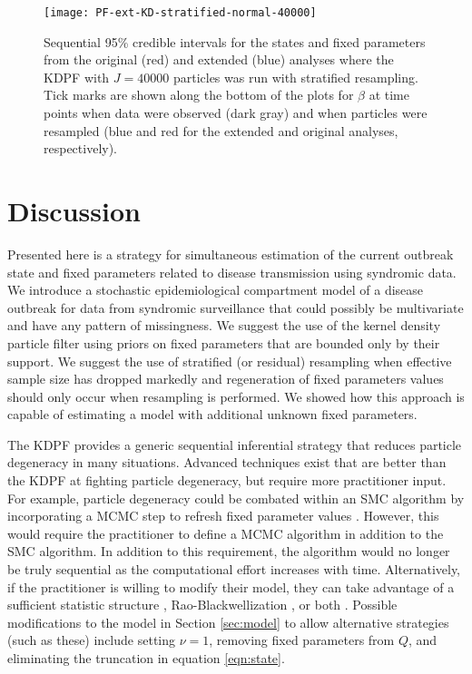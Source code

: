 \documentclass{elsarticle}
\begin{document}
\begin{figure}
\centering
\texttt{[image: PF-ext-KD-stratified-normal-40000]}
\caption{Sequential 95\% credible intervals for the states and fixed parameters from the original (red) and extended (blue) analyses where the KDPF with $J = 40000$ particles was run with stratified resampling. Tick marks are shown along the bottom of the plots for $\beta$ at time points when data were observed (dark gray) and when particles were resampled (blue and red for the extended and original analyses, respectively).} \label{fig:ext}
\end{figure}

\section{Discussion \label{sec:discussion}}

Presented here is a strategy for simultaneous estimation of the current outbreak state and fixed parameters related to disease transmission using syndromic data. We introduce a stochastic epidemiological compartment model of a disease outbreak for data from syndromic surveillance that could possibly be multivariate and have any pattern of missingness. We suggest the use of the kernel density particle filter \citep{Liu:West:comb:2001} using priors on fixed parameters that are bounded only by their support. We suggest the use of stratified (or residual) resampling when effective sample size has dropped markedly and regeneration of fixed parameters values should only occur when resampling is performed. We showed how this approach is capable of estimating a model with additional unknown fixed parameters.

The KDPF provides a generic sequential inferential strategy that reduces particle degeneracy in many situations. Advanced techniques exist that are better than the KDPF at fighting particle degeneracy, but require more practitioner input. For example, particle degeneracy could be combated within an SMC algorithm by incorporating a MCMC step to refresh fixed parameter values \citep{Gilk:Berz:foll:2001,Stor:part:2002}. However, this would require the practitioner to define a MCMC algorithm in addition to the SMC algorithm. In addition to this requirement, the algorithm would no longer be truly sequential as the computational effort increases with time. Alternatively, if the practitioner is willing to modify their model, they can take advantage of a sufficient statistic structure \citep{Fear:mark:2002}, Rao-Blackwellization \citep{Douc:Gods:Andr:on:2000}, or both \citep{carvalho2010particle}. Possible modifications to the model in Section \ref{sec:model} to allow alternative strategies (such as these) include setting $\nu=1$, removing fixed parameters from $Q$, and eliminating the truncation in equation \eqref{eqn:state}.
\end{document}
